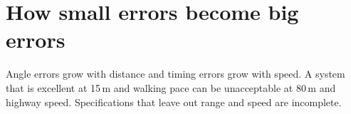 
\section{How small errors become big errors}

\begin{bigidea}
Angle errors grow with distance and timing errors grow with speed. A system that is excellent at 15\,m and walking pace can be unacceptable at 80\,m and highway speed. Specifications that leave out range and speed are incomplete.
\end{bigidea}
